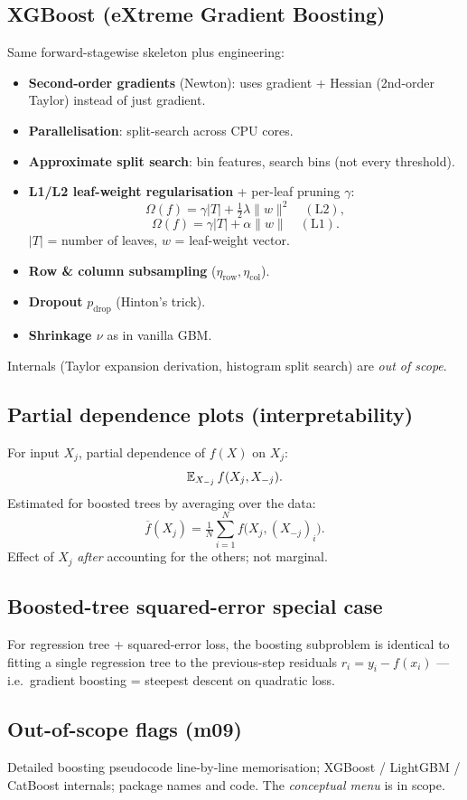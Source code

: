 \subsection{XGBoost (eXtreme Gradient Boosting)}
Same forward-stagewise skeleton plus engineering:
\begin{itemize}
\item \textbf{Second-order gradients} (Newton): uses gradient + Hessian (2nd-order Taylor) instead of just gradient.
\item \textbf{Parallelisation}: split-search across CPU cores.
\item \textbf{Approximate split search}: bin features, search bins (not every threshold).
\item \textbf{L1/L2 leaf-weight regularisation} + per-leaf pruning $\gamma$:
\[ \Omega(f) = \gamma |T| + \tfrac12 \lambda \|w\|^2 \quad (\text{L2}), \]
\[ \Omega(f) = \gamma |T| + \alpha \|w\| \quad (\text{L1}). \]
$|T|$ = number of leaves, $w$ = leaf-weight vector.
\item \textbf{Row \& column subsampling} ($\eta_{\text{row}}, \eta_{\text{col}}$).
\item \textbf{Dropout} $p_{\text{drop}}$ (Hinton's trick).
\item \textbf{Shrinkage $\nu$} as in vanilla GBM.
\end{itemize}
Internals (Taylor expansion derivation, histogram split search) are \emph{out of scope}.

\subsection{Partial dependence plots (interpretability)}
For input $X_j$, partial dependence of $f(X)$ on $X_j$:
\[ \operatorname{\mathbb{E}}_{X_{-j}} f(X_j, X_{-j}). \]
Estimated for boosted trees by averaging over the data:
\[ \overline{f}(X_j) = \tfrac{1}{N} \sum_{i=1}^N f\!\big(X_j, (X_{-j})_i\big). \]
Effect of $X_j$ \emph{after} accounting for the others; not marginal.

\subsection{Boosted-tree squared-error special case}
For regression tree + squared-error loss, the boosting subproblem is identical to fitting a single regression tree to the previous-step residuals $r_i = y_i - f(x_i)$ — i.e.\ gradient boosting = steepest descent on quadratic loss.

\subsection{Out-of-scope flags (m09)}
Detailed boosting pseudocode line-by-line memorisation; XGBoost / LightGBM / CatBoost internals; package names and code. The \emph{conceptual menu} is in scope.

